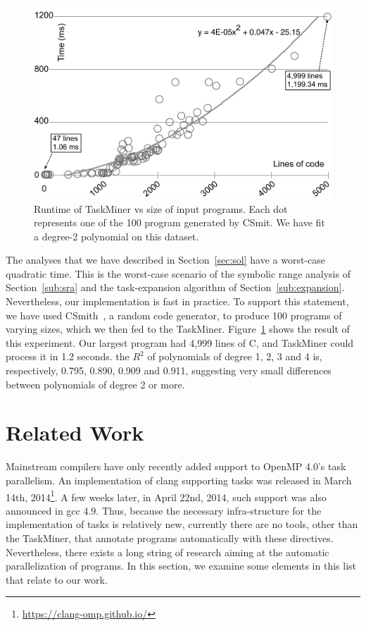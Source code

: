 \documentclass[sigplan,10pt,review,anonymous]{acmart}
\newcommand\Taskminer{\mbox{\textsf{TaskMiner}}}
\begin{document}
\begin{figure}[htb]
\begin{center}
\includegraphics[width=0.9\columnwidth]{images/TM_Runtime}
\caption{Runtime of \Taskminer{} vs size of input programs.
Each dot represents one of the 100 program generated by \textsf{CSmit}.
We have fit a degree-2 polynomial on this dataset.}
\label{fig:TM_Runtime}
\end{center}
\end{figure}

The analyses that we have described in Section~\ref{sec:sol} have a worst-case
quadratic time.
This is the worst-case scenario of the symbolic range analysis of
Section~\ref{sub:sra} and the task-expansion algorithm of
Section~\ref{sub:expansion}.
Nevertheless, our implementation is fast in practice.
To support this statement, we have used \textsf{CSmith}~\cite{Yang11}, a random
code generator, to produce 100 programs of varying sizes, which we then fed to
the \Taskminer.
Figure~\ref{fig:TM_Runtime} shows the result of this experiment.
Our largest program had 4,999 lines of C, and \Taskminer{} could process it
in 1.2 seconds.
the $R^2$ of polynomials of degree 1, 2, 3 and 4 is, respectively, 0.795,
0.890, 0.909 and 0.911, suggesting very small differences between polynomials
of degree 2 or more.

\section{Related Work}
\label{sec:rw}

Mainstream compilers have only recently added support to OpenMP 4.0's task
parallelism.
An implementation of \textsf{clang} supporting tasks was released in March 14th,
2014\footnote{\url{https://clang-omp.github.io/}}.
A few weeks later, in April 22nd, 2014, such support was also announced in
\textsf{gcc} 4.9.
Thus, because the necessary infra-structure for the implementation of tasks is
relatively new, currently there are no tools, other than the \Taskminer,
that annotate programs automatically with these directives.
Nevertheless, there exists a long string of research aiming at the automatic
parallelization of programs.
In this section, we examine some elements in this list that relate to our
work.
\end{document}
